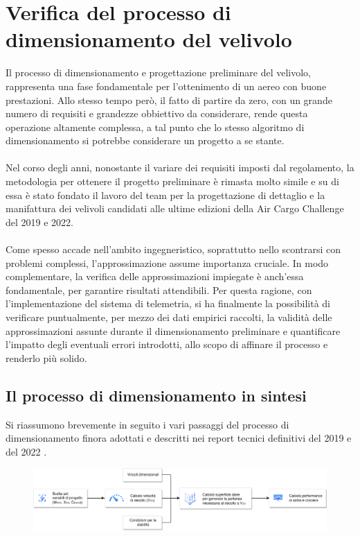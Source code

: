 \documentclass[12pt]{article}
\begin{document}
\section{Verifica del processo di dimensionamento del velivolo}
Il processo di dimensionamento e progettazione preliminare del velivolo, rappresenta una fase fondamentale per l'ottenimento di un aereo con buone prestazioni. Allo stesso tempo però, il fatto di partire da zero, con un grande numero di requisiti e grandezze obbiettivo da considerare, rende questa operazione altamente complessa, a tal punto che lo stesso algoritmo di dimensionamento si potrebbe considerare un progetto a se stante. 
\\\\
Nel corso degli anni, nonostante il variare dei requisiti imposti dal regolamento, la metodologia per ottenere il progetto preliminare è rimasta molto simile e su di essa è stato fondato il lavoro del team per la progettazione di dettaglio e la manifattura dei velivoli candidati alle ultime edizioni della Air Cargo Challenge del 2019 e 2022.
\\\\
Come spesso accade nell'ambito ingegneristico, soprattutto nello scontrarsi con problemi complessi, l'approssimazione assume importanza cruciale. In modo complementare, la verifica delle approssimazioni impiegate è anch'essa fondamentale, per garantire risultati attendibili. Per questa ragione, con l'implementazione del sistema di telemetria, si ha finalmente la possibilità di verificare puntualmente, per mezzo dei dati empirici raccolti, la validità delle approssimazioni assunte durante il dimensionamento preliminare e quantificare l'impatto degli eventuali errori introdotti, allo scopo di affinare il processo e renderlo più solido.

\subsection{Il processo di dimensionamento in sintesi}
Si riassumono brevemente in seguito i vari passaggi del processo di dimensionamento finora adottati e descritti nei report tecnici definitivi del 2019 \cite{report2019} e del 2022 \cite{report2022}.

\begin{figure}[h]
	\centering
	\includegraphics[width=14cm]{img/dimensionamento}
\end{figure}


\newpage


\end{document}
